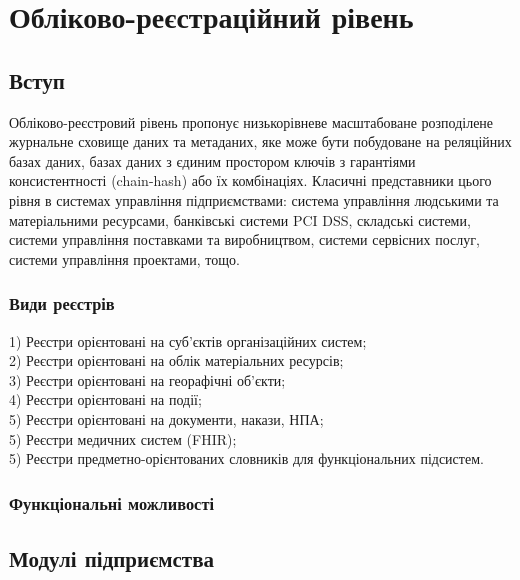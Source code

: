 \chapter{Обліково-реєстраційний рівень}

\section{Вступ}

Обліково-реєстровий рівень пропонує низькорівневе масштабоване розподілене журнальне сховище даних та метаданих, яке може бути побудоване на реляційних базах даних, базах даних з єдиним простором ключів з гарантіями консистентності (chain-hash) або їх комбінаціях. Класичні представники цього рівня в системах управління підприємствами: система управління людськими та матеріальними ресурсами, банківські системи PCI DSS, складські системи, системи управління поставками та виробництвом, системи сервісних послуг, системи управління проектами, тощо.

\subsection{Види реєстрів}

1) Реєстри орієнтовані на суб'єктів організаційних систем; \\
2) Реєстри орієнтовані на облік матеріальних ресурсів; \\
3) Реєстри орієнтовані на георафічні об'єкти; \\
4) Реєстри орієнтовані на події; \\
5) Реєстри орієнтовані на документи, накази, НПА; \\
5) Реєстри медичних систем (FHIR); \\
5) Реєстри предметно-орієнтованих словників для функціональних підсистем. \\

\subsection{Функціональні можливості}

\newpage
\section{Модулі підприємства}


